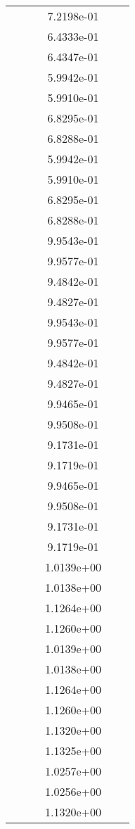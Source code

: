 \begin{xltabular}{\textwidth}{r|rS[table-format=1.3e+2]S[table-format=1.4e+2]S[table-format=1.4e+2]S[table-format=-1.5]}
&  &  & 7.2198e-01 & & \\
&  &  & 6.4333e-01 & & \\
&  &  & 6.4347e-01 & & \\
&  &  & 5.9942e-01 & & \\
&  &  & 5.9910e-01 & & \\
&  &  & 6.8295e-01 & & \\
&  &  & 6.8288e-01 & & \\
&  &  & 5.9942e-01 & & \\
&  &  & 5.9910e-01 & & \\
&  &  & 6.8295e-01 & & \\
&  &  & 6.8288e-01 & & \\
&  &  & 9.9543e-01 & & \\
&  &  & 9.9577e-01 & & \\
&  &  & 9.4842e-01 & & \\
&  &  & 9.4827e-01 & & \\
&  &  & 9.9543e-01 & & \\
&  &  & 9.9577e-01 & & \\
&  &  & 9.4842e-01 & & \\
&  &  & 9.4827e-01 & & \\
&  &  & 9.9465e-01 & & \\
&  &  & 9.9508e-01 & & \\
&  &  & 9.1731e-01 & & \\
&  &  & 9.1719e-01 & & \\
&  &  & 9.9465e-01 & & \\
&  &  & 9.9508e-01 & & \\
&  &  & 9.1731e-01 & & \\
&  &  & 9.1719e-01 & & \\
&  &  & 1.0139e+00 & & \\
&  &  & 1.0138e+00 & & \\
&  &  & 1.1264e+00 & & \\
&  &  & 1.1260e+00 & & \\
&  &  & 1.0139e+00 & & \\
&  &  & 1.0138e+00 & & \\
&  &  & 1.1264e+00 & & \\
&  &  & 1.1260e+00 & & \\
&  &  & 1.1320e+00 & & \\
&  &  & 1.1325e+00 & & \\
&  &  & 1.0257e+00 & & \\
&  &  & 1.0256e+00 & & \\
&  &  & 1.1320e+00 & & \\

\end{xltabular}
